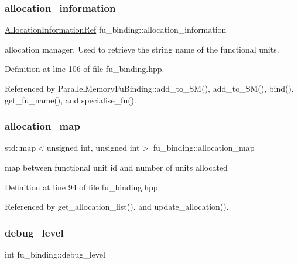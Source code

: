 \subsubsection{\texorpdfstring{allocation\+\_\+information}{allocation\_information}}
{\footnotesize\ttfamily \hyperlink{allocation__information_8hpp_ad90a86da153cba50cbcefc4679036755}{Allocation\+Information\+Ref} fu\+\_\+binding\+::allocation\+\_\+information\hspace{0.3cm}{\ttfamily [protected]}}



allocation manager. Used to retrieve the string name of the functional units. 



Definition at line 106 of file fu\+\_\+binding.\+hpp.



Referenced by Parallel\+Memory\+Fu\+Binding\+::add\+\_\+to\+\_\+\+S\+M(), add\+\_\+to\+\_\+\+S\+M(), bind(), get\+\_\+fu\+\_\+name(), and specialise\+\_\+fu().

\mbox{\label{classfu__binding_a0b6cd9a7b230fcd4ab8184683e4ba96f}} 
\subsubsection{\texorpdfstring{allocation\+\_\+map}{allocation\_map}}
{\footnotesize\ttfamily std\+::map$<$unsigned int, unsigned int$>$ fu\+\_\+binding\+::allocation\+\_\+map\hspace{0.3cm}{\ttfamily [protected]}}



map between functional unit id and number of units allocated 



Definition at line 94 of file fu\+\_\+binding.\+hpp.



Referenced by get\+\_\+allocation\+\_\+list(), and update\+\_\+allocation().

\mbox{\label{classfu__binding_a664f07a748303e2bcea5fbcdd5d26848}} 
\subsubsection{\texorpdfstring{debug\+\_\+level}{debug\_level}}
{\footnotesize\ttfamily int fu\+\_\+binding\+::debug\+\_\+level\hspace{0.3cm}{\ttfamily [protected]}}



